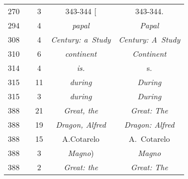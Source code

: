 \documentclass[a4paper,11pt]{article}
\begin{document}
\begin{center}
\begin{tabular}{|c|c|c|c|c|}
    270 & &  3 & 343-344 [ & 343-344. \\
    294 & &  4 & \emph{papal} & \emph{Papal} \\
    308 & &  4 & \emph{Century: a~Study} & \emph{Century: A~Study} \\
    310 & &  6 & \emph{continent} & \emph{Continent} \\
    314 & &  4 & \emph{is.} & s. \\
    315 & & 11 & \emph{during} & \emph{During} \\
    315 & &  3 & \emph{during} & \emph{During} \\
    388 & & 21 & \emph{Great, the} & \emph{Great: The} \\
    388 & & 19 & \emph{Dragon, Alfred} & \emph{Dragon: Alfred} \\
    388 & & 15 & A.Cotarelo & A.~Cotarelo \\
    388 & &  3 & \emph{Magno}) & \emph{Magno} \\
    388 & &  2 & \emph{Great: the} & \emph{Great: The} \\
    \hline
  \end{tabular}


\end{center}
\end{document}
